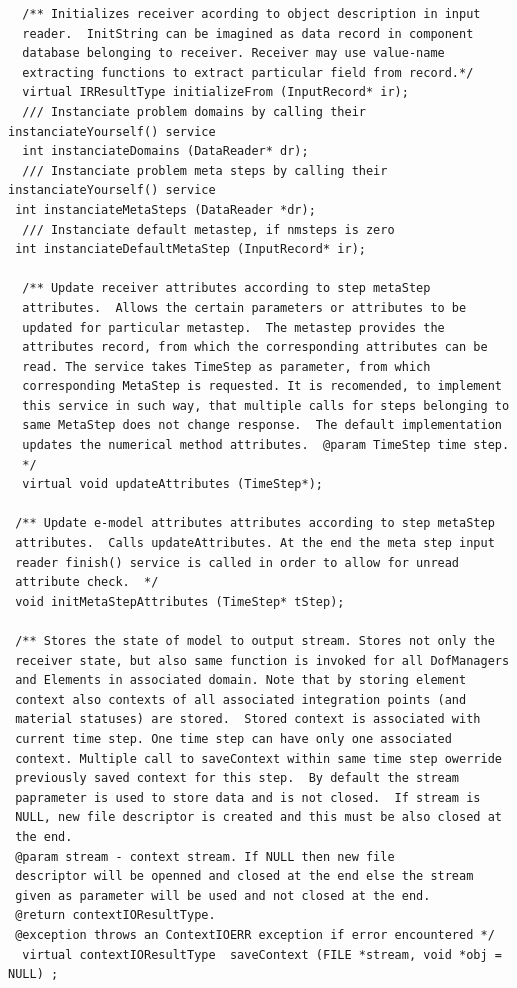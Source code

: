 \documentclass[a4paper]{article}
\begin{document}
{\begin{verbatim}
  /** Initializes receiver acording to object description in input
  reader.  InitString can be imagined as data record in component
  database belonging to receiver. Receiver may use value-name
  extracting functions to extract particular field from record.*/
  virtual IRResultType initializeFrom (InputRecord* ir);
  /// Instanciate problem domains by calling their instanciateYourself() service
  int instanciateDomains (DataReader* dr);
  /// Instanciate problem meta steps by calling their instanciateYourself() service
 int instanciateMetaSteps (DataReader *dr);
  /// Instanciate default metastep, if nmsteps is zero
 int instanciateDefaultMetaStep (InputRecord* ir);

  /** Update receiver attributes according to step metaStep
  attributes.  Allows the certain parameters or attributes to be
  updated for particular metastep.  The metastep provides the
  attributes record, from which the corresponding attributes can be
  read. The service takes TimeStep as parameter, from which
  corresponding MetaStep is requested. It is recomended, to implement
  this service in such way, that multiple calls for steps belonging to
  same MetaStep does not change response.  The default implementation
  updates the numerical method attributes.  @param TimeStep time step.
  */
  virtual void updateAttributes (TimeStep*);

 /** Update e-model attributes attributes according to step metaStep
 attributes.  Calls updateAttributes. At the end the meta step input
 reader finish() service is called in order to allow for unread
 attribute check.  */
 void initMetaStepAttributes (TimeStep* tStep);

 /** Stores the state of model to output stream. Stores not only the
 receiver state, but also same function is invoked for all DofManagers
 and Elements in associated domain. Note that by storing element
 context also contexts of all associated integration points (and
 material statuses) are stored.  Stored context is associated with
 current time step. One time step can have only one associated
 context. Multiple call to saveContext within same time step owerride
 previously saved context for this step.  By default the stream
 paprameter is used to store data and is not closed.  If stream is
 NULL, new file descriptor is created and this must be also closed at
 the end.  
 @param stream - context stream. If NULL then new file
 descriptor will be openned and closed at the end else the stream
 given as parameter will be used and not closed at the end.  
 @return contextIOResultType.  
 @exception throws an ContextIOERR exception if error encountered */
  virtual contextIOResultType  saveContext (FILE *stream, void *obj = NULL) ;


\end{verbatim}}
\end{document}
